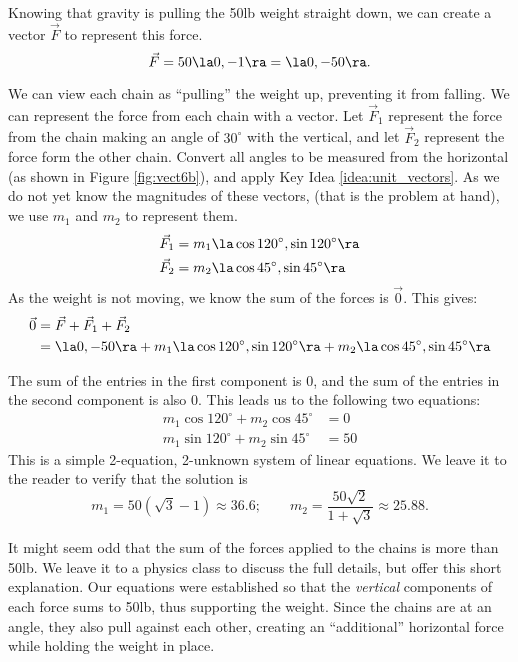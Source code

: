 {Knowing that gravity is pulling the 50lb weight straight down, we can create a vector $\vec F$ to represent this force. 
\[
\vec F = 50\la 0,-1\ra = \la 0,-50\ra.
\]

We can view each chain as ``pulling'' the weight up, preventing it from falling. We can represent the force from each chain with a vector. Let $\vec F_1$ represent the force from the chain making an angle of $30^\circ$ with the vertical, and let $\vec F_2$ represent the force form the other chain. Convert all angles to be measured from the horizontal (as shown in Figure \ref{fig:vect6b}), and apply Key Idea \ref{idea:unit_vectors}. As we do not yet know the magnitudes of these vectors, (that is the problem at hand), we use $m_1$ and $m_2$ to represent them.
\begin{align*}
\vec F_1 &= m_1\la \cos 120^\circ,\sin120^\circ\ra\\
\vec F_2 &= m_2\la \cos 45^\circ,\sin45^\circ\ra
\end{align*}
As the weight is not moving, we know the sum of the forces is $\vec 0$. This gives:
\begin{align*}
\vec 0 & = \vec F + \vec F_1 + \vec F_2 \\
& = \la 0,-50\ra + m_1\la \cos 120^\circ,\sin120^\circ\ra + m_2\la \cos 45^\circ,\sin45^\circ\ra 
\end{align*}

The sum of the entries in the first component is 0, and the sum of the entries in the second component is also 0. This leads us to the following two equations:
\begin{align*}
m_1\cos120^\circ + m_2\cos45^\circ &=0 \\
m_1\sin120^\circ + m_2\sin45^\circ &=50
\end{align*}
This is a simple 2-equation, 2-unknown system of linear equations. We leave it to the reader to verify that the solution is 
\[
m_1=50(\sqrt{3}-1) \approx 36.6;\qquad m_2=\frac{50\sqrt{2}}{1+\sqrt{3}} \approx 25.88.
\]

It might seem odd that the sum of the forces applied to the chains is more than 50lb. We leave it to a physics class to discuss the full details, but offer this short explanation. Our equations were established so that the \textit{vertical} components of each force sums to 50lb, thus supporting the weight. Since the chains are at an angle, they also pull against each other, creating an ``additional'' horizontal force while holding the weight in place.
}\\

